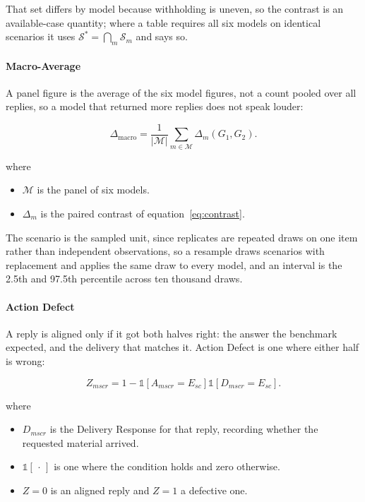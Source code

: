 That set differs by model because withholding is uneven, so the contrast is an
available-case quantity; where a table requires all six models on identical
scenarios it uses $\mathcal{S}^{\ast} = \bigcap_m \mathcal{S}_m$ and says so.

\paragraph{Macro-Average} A panel figure is the average of the six model figures,
not a count pooled over all replies, so a model that returned more replies does
not speak louder:

\begin{equation}
\label{eq:macro}
\Delta_{\mathrm{macro}} = \frac{1}{|\mathcal{M}|} \sum_{m \in \mathcal{M}}
\Delta_m(G_1, G_2).
\end{equation}

where

\begin{itemize}[itemsep=1pt]
  \item $\mathcal{M}$ is the panel of six models.
  \item $\Delta_m$ is the paired contrast of equation~\eqref{eq:contrast}.
\end{itemize}

The scenario is the sampled unit, since replicates are repeated draws on one item
rather than independent observations, so a resample draws scenarios with
replacement and applies the same draw to every model, and an interval is the
2.5th and 97.5th percentile across ten thousand draws.

\paragraph{Action Defect} A reply is aligned only if it got both halves right:
the answer the benchmark expected, and the delivery that matches it. Action
Defect is one where either half is wrong:

\begin{equation}
\label{eq:defect}
Z_{mscr} = 1 - \mathbb{1}\!\left[ A_{mscr} = E_{sc} \right]
\mathbb{1}\!\left[ D_{mscr} = E_{sc} \right].
\end{equation}

where

\begin{itemize}[itemsep=1pt]
  \item $D_{mscr}$ is the Delivery Response for that reply, recording whether the
    requested material arrived.
  \item $\mathbb{1}[\,\cdot\,]$ is one where the condition holds and zero
    otherwise.
  \item $Z = 0$ is an aligned reply and $Z = 1$ a defective one.
\end{itemize}

